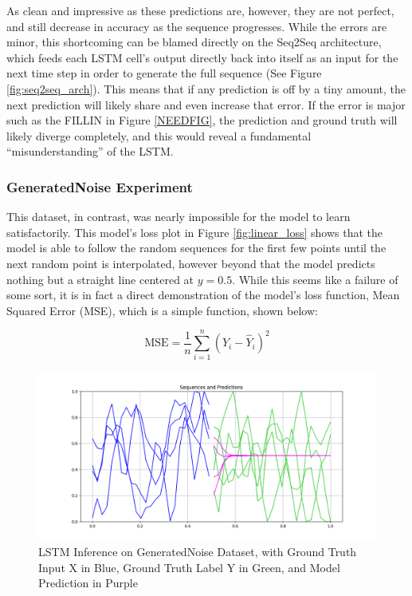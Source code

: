 \documentclass{scrartcl}
\begin{document}
As clean and impressive as these predictions are, however, they are not
perfect, and still decrease in accuracy as the sequence progresses. While the
errors are minor, this shortcoming can be blamed directly on the Seq2Seq
architecture, which feeds each LSTM cell's output directly back into itself as
an input for the next time step in order to generate the full sequence (See
Figure \ref{fig:seq2seq_arch}). This means that if any prediction is off by a
tiny amount, the next prediction will likely share and even increase that
error. If the error is major such as the FILLIN in Figure \ref{NEEDFIG},
the prediction and ground truth will likely diverge completely, and this would
reveal a fundamental ``misunderstanding'' of the LSTM.

\subsubsection{GeneratedNoise Experiment}
\label{subsubsec:generated_noise}

This dataset, in contrast, was nearly impossible for the model to learn
satisfactorily. This model's loss plot in Figure \ref{fig:linear_loss} shows
that the model is able to follow the random sequences for the first few points
until the next random point is interpolated, however beyond that the model
predicts nothing but a straight line centered at $y = 0.5$. While this seems
like a failure of some sort, it is in fact a direct demonstration of the model's
loss function, Mean Squared Error (MSE), which is a simple function, shown below: 

\begin{equation}
	\text{MSE} = \frac{1}{n} \sum_{i = 1}^n ( Y_i - \hat{Y}_i )^2
	 \label{eq:mseloss}
\end{equation}

\begin{figure}[H]
	\centering
	\includegraphics[width=1\textwidth]{plots/lstm_noise_inference.png}
	\caption{LSTM Inference on GeneratedNoise Dataset, with Ground Truth Input X in Blue, Ground Truth Label Y in Green, and Model Prediction in Purple}
	\label{plt:lstm_noise_inference}
\end{figure}
\end{document}
